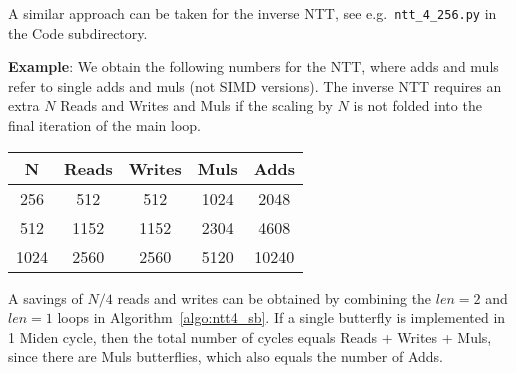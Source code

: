 A similar approach can be taken for the inverse NTT, see e.g.\ \texttt{ntt\_4\_256.py} in the Code subdirectory.

\textbf{Example}: We obtain the following numbers for the NTT, where adds and muls refer to single adds and muls (not SIMD versions).
The inverse NTT requires an extra $N$ Reads and Writes and Muls if the scaling by $N$ is not folded into the final iteration
of the main loop.
\begin{center}
\begin{tabular}{|c|c|c|c|c|} 
\hline
N & Reads & Writes &  Muls & Adds \\
\hline
256 & 512 & 512 & 1024 & 2048   \\
512 & 1152 & 1152 & 2304  & 4608 \\
1024 & 2560 & 2560 &  5120 & 10240 \\
\hline
\end{tabular}
\end{center}

A savings of $N/4$ reads and writes can be obtained by combining the $len=2$ and $len=1$ loops in
Algorithm~\ref{algo:ntt4_sb}.
If a single butterfly is implemented in 1 Miden cycle, then the total number of cycles equals Reads + Writes + Muls, 
since there are Muls butterflies, which also equals the number of Adds.



